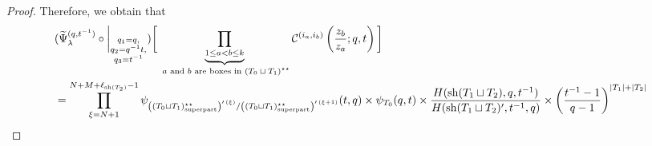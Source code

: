 \documentclass[12pt,reqno,a4paper]{amsart}
\newcommand{\comp}{\circ}
\newcommand{\cals}[1]{\mathcal{#1}}
\numberwithin{equation}{section}
\theoremstyle{definition}
\begin{document}
\begin{proof}
Therefore, we obtain that 
\footnotesize
\begin{align}
	&(
	\widetilde{\Psi}_{\lambda}^{(q,t^{-1})}
	\comp 
	\bigg|_{
		\substack{
			q_1 = q, \\
			q_2 = q^{-1}t,\\
			q_3 = t^{-1} \\
		}
	}
	)
	\bigg[
	\underbrace{	\prod_{1 \leq a < b \leq k}				}_{\text{ $a$ and $b$ are boxes in $(T_0 \sqcup T_1)^{\star\star}$}}
	\cals{C}^{(i_a,i_b)}\left(
	\frac{z_b}{z_a}
	; q, t
	\right)
	\bigg]
	\\
	&= 
	\prod_{\xi = N + 1}^{N + M + \ell_{\operatorname{sh}(T_2)} - 1}
	\psi_{\left(	(T_0 \sqcup T_1)^{\star\star}_{\operatorname{super part}}			\right)^{\prime \, (\xi)}/\left(	(T_0 \sqcup T_1)^{\star\star}_{\operatorname{super part}}			\right)^{\prime \, (\xi + 1)}}(t,q)
	\times 
	\psi_{
		T_0
	}(q,t)
	\times 
	\frac{
		H(\operatorname{sh}(T_1 \sqcup T_2),q,t^{-1})
	}{
		H(\operatorname{sh}(T_1 \sqcup T_2)^\prime,t^{-1},q)
	}
	\times 
	\left(
	\frac{t^{-1} - 1}{q - 1}
	\right)^{
		|T_1| + |T_2|
	}
	\notag 
\end{align}
\normalsize
\end{proof}
\end{document}
